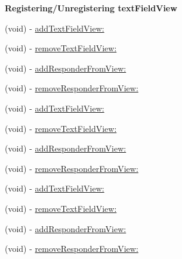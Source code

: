 \begin{Indent}\textbf{ Registering/\+Unregistering text\+Field\+View}\par
{\em 

 

 }\begin{DoxyCompactItemize}
\item 
(void) -\/ \mbox{\hyperlink{interface_i_q_keyboard_return_key_handler_afbac480817c07157f820e34b08a5db70}{add\+Text\+Field\+View\+:}}
\item 
(void) -\/ \mbox{\hyperlink{interface_i_q_keyboard_return_key_handler_ac88fa6e388c4a0040095bde01c1a721d}{remove\+Text\+Field\+View\+:}}
\item 
(void) -\/ \mbox{\hyperlink{interface_i_q_keyboard_return_key_handler_ad6961c2e42c5964dc8a707ce844f26ad}{add\+Responder\+From\+View\+:}}
\item 
(void) -\/ \mbox{\hyperlink{interface_i_q_keyboard_return_key_handler_a4e0801b53d570d1fb99b7eb82bad4392}{remove\+Responder\+From\+View\+:}}
\item 
(void) -\/ \mbox{\hyperlink{interface_i_q_keyboard_return_key_handler_afbac480817c07157f820e34b08a5db70}{add\+Text\+Field\+View\+:}}
\item 
(void) -\/ \mbox{\hyperlink{interface_i_q_keyboard_return_key_handler_ac88fa6e388c4a0040095bde01c1a721d}{remove\+Text\+Field\+View\+:}}
\item 
(void) -\/ \mbox{\hyperlink{interface_i_q_keyboard_return_key_handler_ad6961c2e42c5964dc8a707ce844f26ad}{add\+Responder\+From\+View\+:}}
\item 
(void) -\/ \mbox{\hyperlink{interface_i_q_keyboard_return_key_handler_a4e0801b53d570d1fb99b7eb82bad4392}{remove\+Responder\+From\+View\+:}}
\item 
(void) -\/ \mbox{\hyperlink{interface_i_q_keyboard_return_key_handler_afbac480817c07157f820e34b08a5db70}{add\+Text\+Field\+View\+:}}
\item 
(void) -\/ \mbox{\hyperlink{interface_i_q_keyboard_return_key_handler_ac88fa6e388c4a0040095bde01c1a721d}{remove\+Text\+Field\+View\+:}}
\item 
(void) -\/ \mbox{\hyperlink{interface_i_q_keyboard_return_key_handler_ad6961c2e42c5964dc8a707ce844f26ad}{add\+Responder\+From\+View\+:}}
\item 
(void) -\/ \mbox{\hyperlink{interface_i_q_keyboard_return_key_handler_a4e0801b53d570d1fb99b7eb82bad4392}{remove\+Responder\+From\+View\+:}}
\end{DoxyCompactItemize}
\end{Indent}
